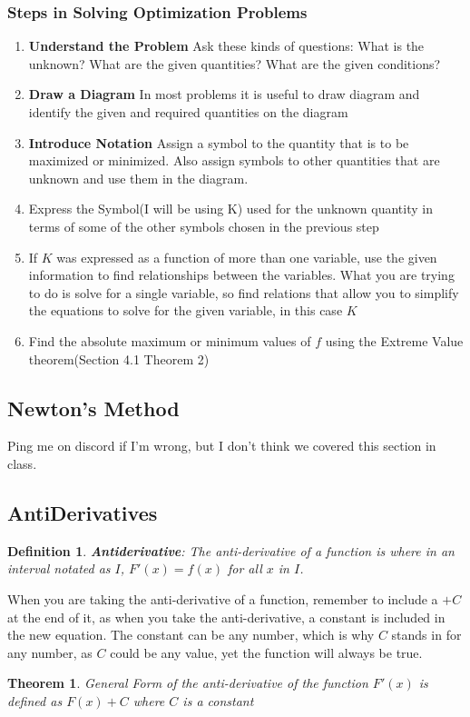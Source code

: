 \documentclass[10pt,a4paper]{article}
\newtheorem{theorem}{Theorem}
\newtheorem{definition}{Definition}
\begin{document}
	\subsubsection{Steps in Solving Optimization Problems}
		\begin{enumerate}
			\item \textbf{Understand the Problem} Ask these kinds of questions: What is the unknown? What are the given quantities? What are the given conditions?
			
			\item \textbf{Draw a Diagram} In most problems it is useful to draw diagram and identify the given and required quantities on the diagram
			
			\item \textbf{Introduce Notation} Assign a symbol to the quantity that is to be maximized or minimized. Also assign symbols to other quantities that are unknown and use them in the diagram.
			
			\item Express the Symbol(I will be using K) used for the unknown quantity in terms of some of the other symbols chosen in the previous step
			
			\item If $K$ was expressed as a function of more than one variable, use the given information to find relationships between the variables. What you are trying to do is solve for a single variable, so find relations that allow you to simplify the equations to solve for the given variable, in this case $K$
			
			\item Find the absolute maximum or minimum values of $f$ using the Extreme Value theorem(Section 4.1 Theorem 2)
		\end{enumerate}
			
\subsection{Newton's Method}
	Ping me on discord if I'm wrong, but I don't think we covered this section in class.
	
\subsection{AntiDerivatives}
	\begin{definition}
		\textbf{Antiderivative}: The anti-derivative of a function is where in an interval notated as $I$, $F'(x) = f(x)$ for all $x$ in $I$.
	\end{definition}
	When you are taking the anti-derivative of a function, remember to include a $+C$ at the end of it, as when you take the anti-derivative, a constant is included in the new equation. The constant can be any number, which is why $C$ stands in for any number, as $C$ could be any value, yet the function will always be true.
	\begin{theorem}
		General Form of the anti-derivative of the function $F'(x)$ is defined as $F(x) + C$ where $C$ is a constant
	\end{theorem}
	
\end{document}
